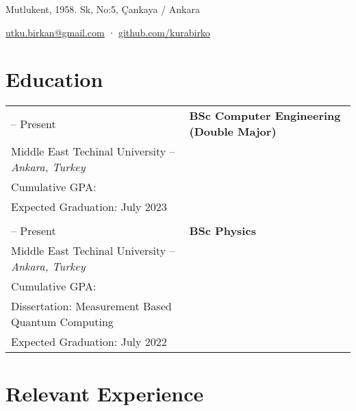 \documentclass[11pt]{article} %
\makeatletter
\newlength{\firstColumnWidth}
\newlength{\tabusep}
\newcommand{\Tr}[1]{\textturkish{#1}}
\newcommand{\twoNewline}{\tabularnewline & \tabularnewline}
\newcommand\liningnumbers{\addfontfeature{Numbers=Lining}}
\newenvironment{twocols}
    {
    \begin{longtable}[h]{%
        @{}%
        >{\raggedleft}p{\firstColumnWidth}%
        @{\hspace{\tabusep}}%
        >{\arraybackslash\raggedright}p{\dimexpr %
            \linewidth-\firstColumnWidth-\tabusep%
        \relax}%
        @{}%
        }
    } {
        \end{longtable}
    }
\makeatother
\begin{document}
\begin{center}
	\Tr{\huge {}} \medskip \par
    Mutlukent, 1958. Sk, No:5, Çankaya / Ankara  \par
	\href{mailto:utku.birkan@gmail.com}{utku.birkan@gmail.com} \hspace{2pt} · \hspace{2pt}
    \href{https://github.com/kurabirko}{github.com/kurabirko}\par
\end{center}

\section{Education}

\begin{twocols}
  2018 -- Present & %
    \textbf{BSc Computer Engineering (Double Major)} \\
    Middle East Techinal University -- \textit{Ankara, Turkey} \\
    Cumulative GPA: \liningnumbers{3.70} \\
    Expected Graduation: July 2023 \twoNewline
  2017 -- Present & %
    \textbf{BSc Physics} \\
    Middle East Techinal University -- \textit{Ankara, Turkey} \\
    Cumulative GPA: \liningnumbers{3.55} \\
    Dissertation: Measurement Based Quantum Computing \\
    Expected Graduation: July 2022
\end{twocols}

\section{Relevant Experience}
\end{document}
